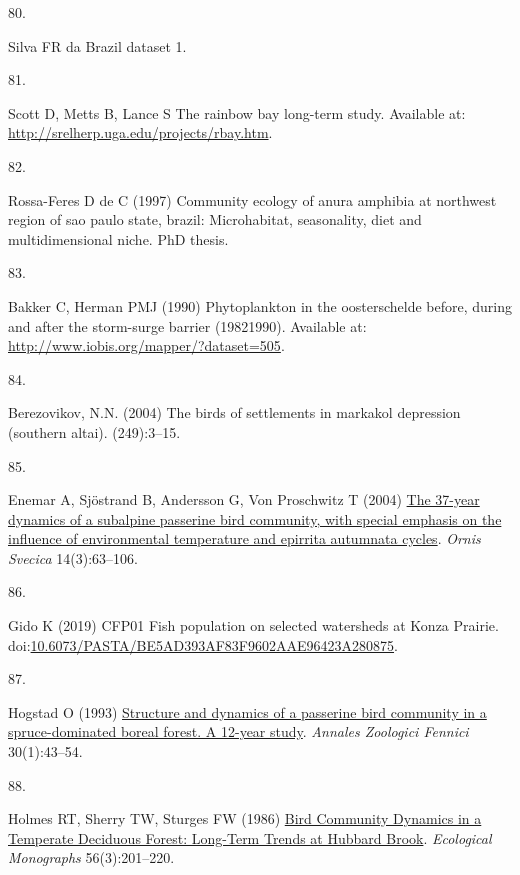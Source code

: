 \documentclass{article}
\newlength{\cslhangindent}
\newlength{\csllabelwidth}
\newlength{\cslentryspacingunit} %
\newenvironment{CSLReferences}[2] %
 {%
  \setlength{\parindent}{0pt}
  \ifodd #1
  \let\oldpar\par
  \def\par{\hangindent=\cslhangindent\oldpar}
  \fi
  \setlength{\parskip}{#2\cslentryspacingunit}
 }%
 {}
\newcommand{\CSLLeftMargin}[1]{\parbox[t]{\csllabelwidth}{#1}}
\newcommand{\CSLRightInline}[1]{\parbox[t]{\linewidth - \csllabelwidth}{#1}\break}
\begin{document}
\begin{CSLReferences}{0}{0}
\leavevmode{}%
\CSLLeftMargin{80. }%
\CSLRightInline{Silva FR da Brazil dataset 1.}

\leavevmode{}%
\CSLLeftMargin{81. }%
\CSLRightInline{Scott D, Metts B, Lance S The rainbow bay long-term
study. Available at: \url{http://srelherp.uga.edu/projects/rbay.htm}.}

\leavevmode{}%
\CSLLeftMargin{82. }%
\CSLRightInline{Rossa-Feres D de C (1997) Community ecology of anura
amphibia at northwest region of sao paulo state, brazil: Microhabitat,
seasonality, diet and multidimensional niche. PhD thesis.}

\leavevmode{}%
\CSLLeftMargin{83. }%
\CSLRightInline{Bakker C, Herman PMJ (1990) Phytoplankton in the
oosterschelde before, during and after the storm-surge barrier
(1982{\textendash}1990). Available at:
\url{http://www.iobis.org/mapper/?dataset=505}.}

\leavevmode{}%
\CSLLeftMargin{84. }%
\CSLRightInline{Berezovikov, N.N. (2004) The birds of settlements in
markakol depression (southern altai). (249):3--15.}

\leavevmode{}%
\CSLLeftMargin{85. }%
\CSLRightInline{Enemar A, Sjöstrand B, Andersson G, Von Proschwitz T
(2004) \href{https://doi.org/10.34080/os.v14.20236}{The 37-year dynamics
of a subalpine passerine bird community, with special emphasis on the
influence of environmental temperature and epirrita autumnata cycles}.
\emph{Ornis Svecica} 14(3):63--106.}

\leavevmode{}%
\CSLLeftMargin{86. }%
\CSLRightInline{Gido K (2019) CFP01 Fish population on selected
watersheds at Konza Prairie.
doi:\href{https://doi.org/10.6073/PASTA/BE5AD393AF83F9602AAE96423A280875}{10.6073/PASTA/BE5AD393AF83F9602AAE96423A280875}.}

\leavevmode{}%
\CSLLeftMargin{87. }%
\CSLRightInline{Hogstad O (1993)
\href{https://www.jstor.org/stable/23735355}{Structure and dynamics of a
passerine bird community in a spruce-dominated boreal forest. A 12-year
study}. \emph{Annales Zoologici Fennici} 30(1):43--54.}

\leavevmode{}%
\CSLLeftMargin{88. }%
\CSLRightInline{Holmes RT, Sherry TW, Sturges FW (1986)
\href{https://doi.org/10.2307/2937074}{Bird Community Dynamics in a
Temperate Deciduous Forest: Long-Term Trends at Hubbard Brook}.
\emph{Ecological Monographs} 56(3):201--220.}


\end{CSLReferences}
\end{document}
